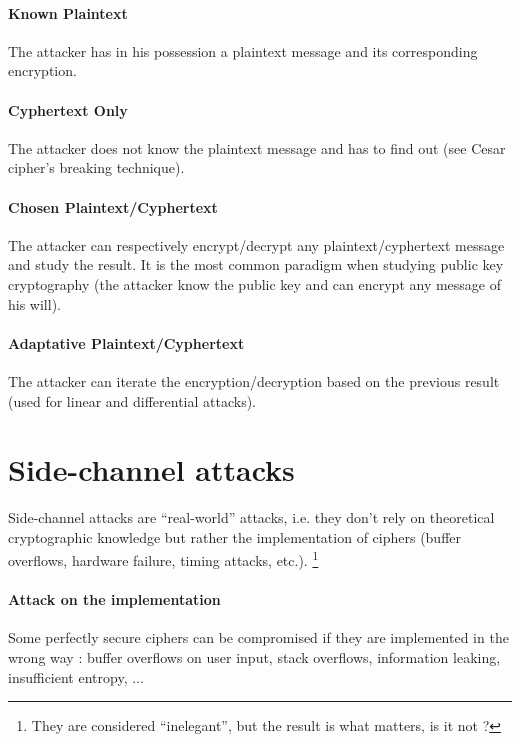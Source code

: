 \paragraph{Known Plaintext  \\} The attacker has in his possession a plaintext message and its corresponding encryption.

\paragraph{Cyphertext Only  \\} The attacker does not know the plaintext message and has to find out (see Cesar cipher's breaking technique).

\paragraph{Chosen Plaintext/Cyphertext \\} 
The attacker can respectively encrypt/decrypt any plaintext/cyphertext message and study the result. It is the most common paradigm when studying public key cryptography (the attacker know the public key and can encrypt any message of his will).

\paragraph{Adaptative Plaintext/Cyphertext \\} 
The attacker can iterate the encryption/decryption based on the previous result (used for linear and differential attacks).

\section{Side-channel attacks}
Side-channel attacks are ``real-world'' attacks, i.e. they don't rely on theoretical cryptographic knowledge but rather the implementation of ciphers (buffer overflows, hardware failure, timing attacks, etc.). \footnote{ They are considered ``inelegant'', but the result is what matters, is it not ?}

\paragraph{Attack on the implementation \\}
Some perfectly secure ciphers can be compromised if they are implemented in the wrong way : buffer overflows on user input, stack overflows, information leaking, insufficient entropy, ...   

